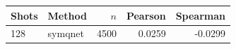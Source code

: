 \begin{tabular}{llrrr}
\toprule
Shots & Method & $n$ & Pearson & Spearman \\
\midrule
128 & symqnet & 4500 & 0.0259 & -0.0299 \\
\bottomrule
\end{tabular}
